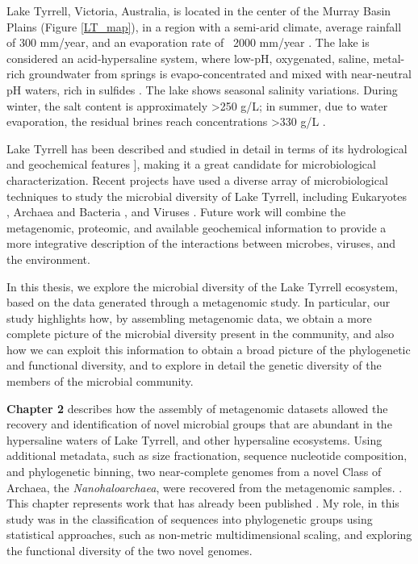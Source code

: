 Lake Tyrrell, Victoria, Australia, is located in the center of the Murray Basin Plains (Figure \ref{LT_map}), in a region with a semi-arid climate, average rainfall of 300 mm/year, and an evaporation rate of ~2000 mm/year  \cite{Macumber:1992ty}. The lake is considered an acid-hypersaline system, where low-pH, oxygenated, saline, metal-rich groundwater from springs is evapo-concentrated and mixed with near-neutral pH waters, rich in sulfides \cite{Long:1992ie}. The lake shows seasonal salinity variations. During winter, the salt content is approximately  \textgreater 250 g/L; in summer, due to water evaporation, the residual brines reach concentrations \textgreater 330 g/L \cite{Macumber:1992ty}.

Lake Tyrrell has been described and studied in detail in terms of its hydrological and geochemical features  \cite{Long:1992ie,Macumber:1992ty,Jones:2006jn}], making it a great candidate for microbiological characterization. Recent projects have used a diverse array of microbiological techniques to study the microbial diversity of Lake Tyrrell, including Eukaryotes \cite{KarlaBHeidelberg:2013jc}, Archaea and Bacteria \cite{Podell:2013kx,Narasingarao:2012kp,Ugalde:2013hb}, and Viruses \cite{Emerson:2012gh,Emerson:tk}. Future work will combine the metagenomic, proteomic, and available geochemical information to provide a more integrative description of the interactions between microbes, viruses, and the environment. 

In this thesis, we explore the microbial diversity of the Lake Tyrrell ecosystem, based on the data generated through a metagenomic study. In particular, our study highlights how, by assembling metagenomic data, we obtain a more complete picture of the microbial diversity present in the community, and also how we can exploit this information to obtain a broad picture of the phylogenetic and functional diversity, and to explore in detail the genetic diversity of the members of the microbial community.

\textbf{Chapter 2} describes how the assembly of metagenomic datasets allowed the recovery and identification of novel microbial groups that are abundant in the hypersaline waters of Lake Tyrrell, and other hypersaline ecosystems. Using additional metadata, such as size fractionation, sequence nucleotide composition, and phylogenetic binning, two near-complete genomes from a novel Class of Archaea, the \textit{Nanohaloarchaea}, were recovered from the metagenomic samples. . This chapter represents work that has already been published  \cite{Narasingarao:2012kp}. My role, in this study was in the classification of sequences into phylogenetic groups using statistical approaches, such as non-metric multidimensional scaling, and exploring the functional diversity of the two novel genomes.

